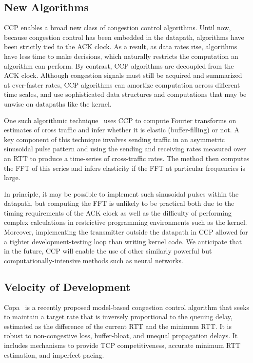 \subsection{New Algorithms}
\label{s:capabilities:algs}

CCP enables a broad new class of congestion control algorithms.
Until now, because congestion control has been embedded in the datapath,
algorithms have been strictly tied to the ACK clock.
As a result, as data rates rise, algorithms have less time to make decisions,
which naturally restricts the computation an algorithm can perform.
By contrast, CCP algorithms are decoupled from the ACK clock.
Although congestion signals must still be acquired and summarized at ever-faster rates, CCP algorithms can amortize computation across different time scales, and use sophisticated data structures and computations that may be unwise on datapaths like the kernel.

One such algorithmic technique~\cite{nimbus} uses CCP to compute Fourier transforms on estimates of cross traffic and infer whether it is elastic (buffer-filling) or not.
A key component of this technique involves sending traffic in an asymmetric sinusoidal pulse pattern and using the sending and receiving rates measured over an RTT to produce a time-series of cross-traffic rates. The method then computes the FFT of this series and infers elasticity if the FFT at particular frequencies is large.

In principle, it may be possible to implement such sinusoidal pulses within the datapath, but computing the FFT is unlikely to be practical both due to the timing requirements of the ACK clock as well as the difficulty of performing complex calculations in restrictive programming environments such as the kernel. Moreover, implementing the transmitter outside the datapath in CCP allowed for a tighter development-testing loop than writing kernel code.
We anticipate that in the future, CCP will enable the use of other similarly powerful but computationally-intensive methods such as neural networks.

\subsection{Velocity of Development}
\label{s:capabilities:velocity}

Copa~\cite{copa} is a recently proposed model-based congestion control algorithm that seeks to maintain a target rate that is inversely proportional to the queuing delay, estimated as the difference of the current RTT and the minimum RTT.
It is robust to non-congestive loss, buffer-bloat, and unequal propagation delays. It includes mechanisms to provide TCP competitiveness, accurate minimum RTT estimation, and imperfect pacing.

